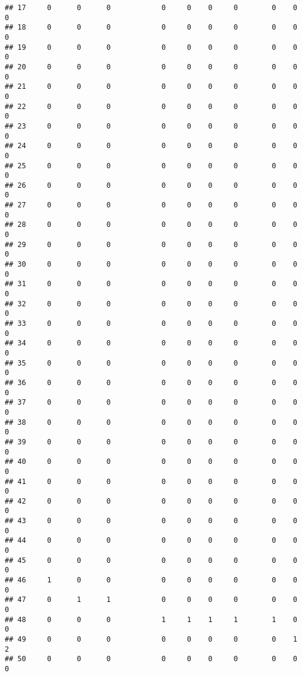 \documentclass[
]{article}
\begin{document}
\begin{verbatim}
## 17     0      0      0            0     0    0     0        0    0       0
## 18     0      0      0            0     0    0     0        0    0       0
## 19     0      0      0            0     0    0     0        0    0       0
## 20     0      0      0            0     0    0     0        0    0       0
## 21     0      0      0            0     0    0     0        0    0       0
## 22     0      0      0            0     0    0     0        0    0       0
## 23     0      0      0            0     0    0     0        0    0       0
## 24     0      0      0            0     0    0     0        0    0       0
## 25     0      0      0            0     0    0     0        0    0       0
## 26     0      0      0            0     0    0     0        0    0       0
## 27     0      0      0            0     0    0     0        0    0       0
## 28     0      0      0            0     0    0     0        0    0       0
## 29     0      0      0            0     0    0     0        0    0       0
## 30     0      0      0            0     0    0     0        0    0       0
## 31     0      0      0            0     0    0     0        0    0       0
## 32     0      0      0            0     0    0     0        0    0       0
## 33     0      0      0            0     0    0     0        0    0       0
## 34     0      0      0            0     0    0     0        0    0       0
## 35     0      0      0            0     0    0     0        0    0       0
## 36     0      0      0            0     0    0     0        0    0       0
## 37     0      0      0            0     0    0     0        0    0       0
## 38     0      0      0            0     0    0     0        0    0       0
## 39     0      0      0            0     0    0     0        0    0       0
## 40     0      0      0            0     0    0     0        0    0       0
## 41     0      0      0            0     0    0     0        0    0       0
## 42     0      0      0            0     0    0     0        0    0       0
## 43     0      0      0            0     0    0     0        0    0       0
## 44     0      0      0            0     0    0     0        0    0       0
## 45     0      0      0            0     0    0     0        0    0       0
## 46     1      0      0            0     0    0     0        0    0       0
## 47     0      1      1            0     0    0     0        0    0       0
## 48     0      0      0            1     1    1     1        1    0       0
## 49     0      0      0            0     0    0     0        0    1       2
## 50     0      0      0            0     0    0     0        0    0       0

\end{verbatim}
\end{document}

